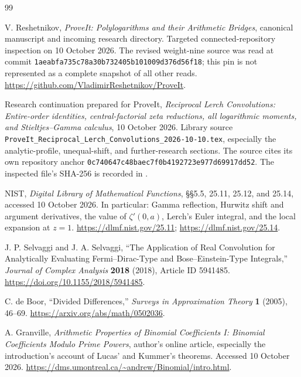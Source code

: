 \documentclass[11pt,letterpaper]{article}
\numberwithin{equation}{section}
\theoremstyle{definition}\newtheorem{definition}[theorem]{Definition}
\theoremstyle{remark}\newtheorem{remark}[theorem]{Remark}
\newcommand{\src}[1]{\texttt{\small\detokenize{#1}}}
\begin{document}
\begin{thebibliography}{99}
V. Reshetnikov, \emph{ProveIt: Polylogarithms and their Arithmetic Bridges}, canonical manuscript and incoming research directory. Targeted connected-repository inspection on 10 October 2026. The revised weight-nine source was read at commit
\nolinkurl{1aeabfa735c78a30b732405b101009d376d56f18}; this pin is not represented as a complete snapshot of all other reads.
\url{https://github.com/VladimirReshetnikov/ProveIt}.

Research continuation prepared for ProveIt,
\emph{Reciprocal Lerch Convolutions: Entire-order identities, central-factorial zeta reductions, all logarithmic moments, and Stieltjes--Gamma calculus}, 10 October 2026.
Library source \nolinkurl{ProveIt_Reciprocal_Lerch_Convolutions_2026-10-10.tex}, especially the analytic-profile, unequal-shift, and further-research sections. The source cites its own repository anchor
\nolinkurl{0c740647c48baec7f0b4192723e977d69917dd52}.
The inspected file's SHA-256 is recorded in \src{SOURCE_AUDIT.md}.

NIST, \emph{Digital Library of Mathematical Functions},
\S\S5.5, 25.11, 25.12, and 25.14, accessed 10 October 2026.
In particular: Gamma reflection, Hurwitz shift and argument derivatives, the value of $\zeta'(0,a)$, Lerch's Euler integral, and the local expansion at $z=1$.
\url{https://dlmf.nist.gov/25.11};
\url{https://dlmf.nist.gov/25.14}.

J. P. Selvaggi and J. A. Selvaggi,
``The Application of Real Convolution for Analytically Evaluating Fermi--Dirac-Type and Bose--Einstein-Type Integrals,''
\emph{Journal of Complex Analysis} \textbf{2018} (2018), Article ID 5941485.
\url{https://doi.org/10.1155/2018/5941485}.

C. de Boor, ``Divided Differences,''
\emph{Surveys in Approximation Theory} \textbf{1} (2005), 46--69.
\url{https://arxiv.org/abs/math/0502036}.

A. Granville, \emph{Arithmetic Properties of Binomial Coefficients I: Binomial Coefficients Modulo Prime Powers}, author's online article, especially the introduction's account of Lucas' and Kummer's theorems. Accessed 10 October 2026.
\url{https://dms.umontreal.ca/~andrew/Binomial/intro.html}.
\end{thebibliography}
\end{document}
